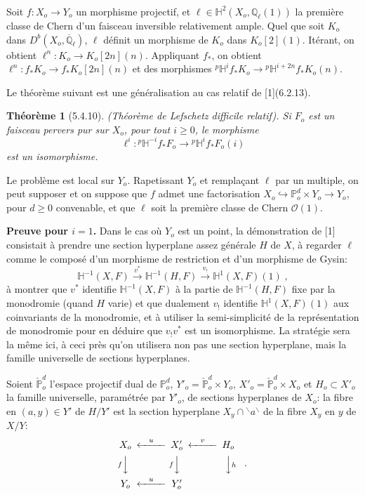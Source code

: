\documentclass[12pt,a4paper]{article}
\theoremstyle{plain}
\newtheorem{theorem}{Th\'eor\`eme}[section]
\theoremstyle{definition}
\theoremstyle{remark}
\newcommand{\HH}{\mathbb{H}}
\newcommand{\PP}{\mathbb{P}}
\newcommand{\QQ}{\mathbb{Q}}
\newcommand{\cO}{\mathcal{O}}
\begin{document}
\subsubsection{}
Soit $f: X_o \to Y_o$ un morphisme projectif, et $\ell \in \HH^2(X_o, \QQ_{\ell}(1))$ la premi\`ere classe de Chern d'un faisceau inversible relativement ample. Quel que soit $K_o$ dans $D^b(X_o, \overline{\QQ}_{\ell})$, $\ell$ d\'efinit un morphisme de $K_o$ dans $K_o[2](1)$. It\'erant, on obtient $\ell^n: K_o \to K_o[2n](n)$. Appliquant $f_*$, on obtient $\ell^n: f_*K_o \to f_*K_o[2n](n)$ et des morphismes ${}^{p}\HH^if_*K_o \to {}^{p}\HH^{i+2n}f_*K_o(n)$.

Le th\'eor\`eme suivant est une g\'en\'eralisation au cas relatif de [1](6.2.13).

\begin{theorem}[5.4.10]\label{thm:5.4.10}(Th\'eor\`eme de Lefschetz difficile relatif).
Si $F_o$ est un faisceau pervers pur sur $X_o$, pour tout $i \geq 0$, le morphisme
\[
\ell^i: {}^{p}\HH^{-i}f_*F_o \to {}^{p}\HH^if_*F_o(i)
\]
est un isomorphisme.
\end{theorem}

Le probl\`eme est local sur $Y_o$. Rapetissant $Y_o$ et rempla\c{c}ant $\ell$ par un multiple, on peut supposer et on suppose que $f$ admet une factorisation $X_o \hookrightarrow \PP^d_o \times Y_o \to Y_o$, pour $d \geq 0$ convenable, et que $\ell$ soit la premi\`ere classe de Chern $\cO(1)$.

\medskip
\noindent\textbf{Preuve pour $i = 1$.} Dans le cas o\`u $Y_o$ est un point, la d\'emonstration de [1] consistait \`a prendre une section hyperplane assez g\'en\'erale $H$ de $X$, \`a regarder $\ell$ comme le compos\'e d'un morphisme de restriction et d'un morphisme de Gysin:
\[
\HH^{-1}(X, F) \xrightarrow{v^*} \HH^{-1}(H, F) \xrightarrow{v_!} \HH^1(X, F)(1)\;,
\]
\`a montrer que $v^*$ identifie $\HH^{-1}(X, F)$ \`a la partie de $\HH^{-1}(H, F)$ fixe par la monodromie (quand $H$ varie) et que dualement $v_!$ identifie $\HH^1(X, F)(1)$ aux coinvariants de la monodromie, et \`a utiliser la semi-simplicit\'e de la repr\'esentation de monodromie pour en d\'eduire que $v_!v^*$ est un isomorphisme. La strat\'egie sera la m\^eme ici, \`a ceci pr\`es qu'on utilisera non pas une section hyperplane, mais la famille universelle de sections hyperplanes.

Soient $\check{\PP}^d_o$ l'espace projectif dual de $\PP^d_o$, $Y'_o = \check{\PP}^d_o \times Y_o$, $X'_o = \check{\PP}^d_o \times X_o$ et $H_o \subset X'_o$ la famille universelle, param\'etr\'ee par $Y'_o$, de sections hyperplanes de $X_o$: la fibre en $(a, y) \in Y'$ de $H/Y'$ est la section hyperplane $X_y \cap {}^\backslash a{}^\backslash$ de la fibre $X_y$ en $y$ de $X/Y$:
\[
\begin{CD}
X_o @<{u}<< X'_o @<{v}<< H_o \\
@V{f}VV @V{f}VV @VV{h}V \\
Y_o @<{u}<< Y'_o
\end{CD}\quad.
\]
\end{document}
